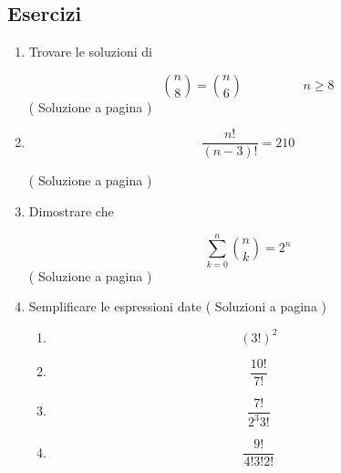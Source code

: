 \subsection{Esercizi}

\begin{enumerate}
\item

Trovare le soluzioni di

\begin{equation*}
\binom{n}{8}=\binom{n}{6} \hspace{2cm} n \geq 8
\end{equation*}
( Soluzione a pagina \pageref{combs_01} \label{combl_01} )



\item 

\begin{equation*}
\frac{n!}{(n-3)!} = 210
\end{equation*}

( Soluzione a pagina \pageref{combs_02} \label{combl_02} )

\item
Dimostrare che 

\begin{equation*}
\sum_{k=0}^{n}{\binom{n}{k}}=2^n
\end{equation*}
( Soluzione a pagina \pageref{combs_03} \label{combl_03} )


\item Semplificare le espressioni date
( Soluzioni a pagina \pageref{combs_04} \label{combl_04} )

\begin{enumerate}

\item
\begin{equation*}
(3!)^2
\end{equation*}


\item 
\begin{equation*}
\frac{10!}{7!}
\end{equation*}

\item 
\begin{equation*}
\frac{7!}{2^3 3!}
\end{equation*}

\item 
\begin{equation*}
\frac{9!}{4!3!2!}
\end{equation*}


\end{enumerate}
\end{enumerate}
